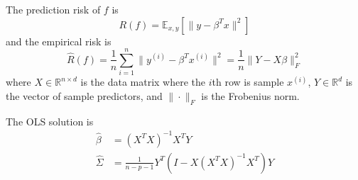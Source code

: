   \begin{lemma}[Risk]
    The prediction risk of $f$ is 
    \begin{equation}
      R(f) = \mathbb{E}_{x, y} \left[ \| y - \beta^T x \|^2 \right]
    \end{equation}
    and the empirical risk is 
    \begin{equation}
      \hat{R}(f) = \frac{1}{n} \sum_{i=1}^n \| y^{(i)} - \beta^T x^{(i)} \|^2 = \frac{1}{n} \|Y - X \beta\|_F^2
    \end{equation}
    where $X \in \mathbb{R}^{n \times d}$ is the data matrix where the $i$th row is sample $x^{(i)}$, $Y \in \mathbb{R}^d$ is the vector of sample predictors, and $\| \cdot \|_F$ is the Frobenius norm. 
  \end{lemma}

  \begin{theorem}
    The OLS solution is 
    \begin{align}
      \hat{\beta} & = (X^T X)^{-1} X^T Y \\ 
      \hat{\Sigma} & = \frac{1}{n - p - 1} Y^T (I - X (X^T X)^{-1} X^T) Y
    \end{align}
  \end{theorem} 

